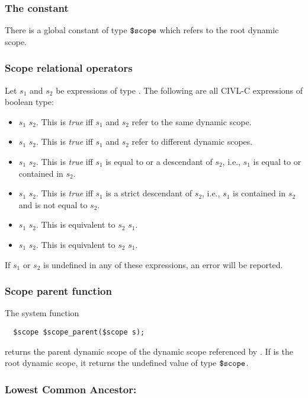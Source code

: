 \subsubsection{The constant \cscoperoot{}}

There is a global constant \cscoperoot{} of type $\mbox{\texttt{\${}scope}}$ which
refers to the root dynamic scope.


\subsubsection{Scope relational operators}

Let $s_1$ and $s_2$ be expressions of type \cscope.  The following are
all CIVL-C expressions of boolean type:
\begin{itemize}
\item $s_1$ \ct{==} $s_2$.  This is \emph{true} iff $s_1$ and $s_2$
  refer to the same dynamic scope.
\item  $s_1$ \ct{!=} $s_2$.  This is \emph{true} iff $s_1$ and $s_2$
  refer to different dynamic scopes.
\item  $s_1$ \ct{<=} $s_2$.  This is \emph{true} iff $s_1$ is equal to
  or a descendant of $s_2$, i.e., $s_1$ is equal to or contained in $s_2$.
\item  $s_1$ \ct{<} $s_2$.  This is \emph{true} iff $s_1$ is a strict 
  descendant of $s_2$, i.e., $s_1$ is contained in $s_2$ and is not
  equal to $s_2$.
\item $s_1$ \ct{>} $s_2$.  This is equivalent to $s_2$ \ct{<} $s_1$.
\item  $s_1$ \ct{>=} $s_2$.  This is equivalent to $s_2$ \ct{<=} $s_1$.
\end{itemize}
If $s_1$ or $s_2$ is undefined in any of these expressions, an error
will be reported.

\subsubsection{Scope parent function \texorpdfstring{\cscopeparent}{\$scope\_parent}}

The system function
\begin{verbatim}
  $scope $scope_parent($scope s);
\end{verbatim}
returns the parent dynamic scope of the dynamic scope referenced by
.  If  is the root dynamic scope, it returns the undefined
value of type $\mbox{\texttt{\${}scope}}$.

\subsubsection{Lowest Common Ancestor: \ct{+}}

